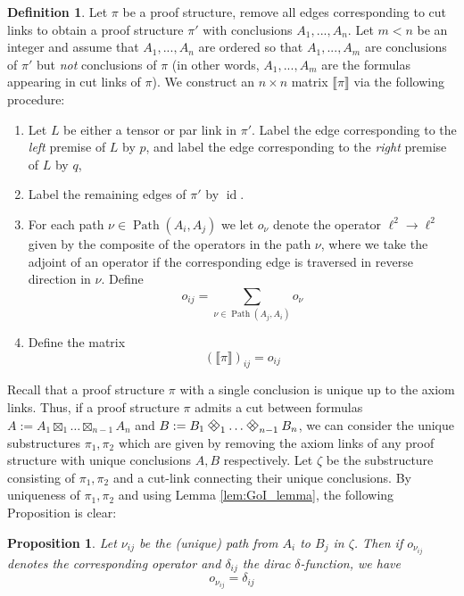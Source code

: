\documentclass[12pt]{article}
\theoremstyle{plain}
\newtheorem{proposition}[thm]{Proposition}
\theoremstyle{definition}
\newtheorem{defn}[thm]{Definition} %
\newcommand{\lto}{\longrightarrow}
\DeclareRobustCommand{\diamondtimes}{%
	\mathbin{\text{\rotatebox[origin=c]{45}{$\boxplus$}}}%
}
\begin{document}
	\begin{defn}
		Let $\pi$ be a proof structure, remove all edges corresponding to cut links to obtain a proof structure $\pi'$ with conclusions $A_1,...,A_n$.  Let $m < n$ be an integer and assume that $A_1,...,A_n$ are ordered so that $A_1,...,A_m$ are conclusions of $\pi'$ but \emph{not} conclusions of $\pi$ (in other words, $A_1,...,A_m$ are the formulas appearing in cut links of $\pi$).  We construct an $n \times n$ matrix $\llbracket \pi \rrbracket$ via the following procedure:
		\begin{enumerate}
			\item Let $L$ be either a tensor or par link in $\pi'$. Label the edge corresponding to the \emph{left} premise of $L$ by $p$, and label the edge corresponding to the \emph{right} premise of $L$ by $q$,
			\item Label the remaining edges of $\pi'$ by $\operatorname{id}$.
			\item For each path $\nu \in \operatorname{Path}(A_i,A_j)$ we let $o_\nu$ denote the operator $\ell^2 \lto \ell^2$ given by the composite of the operators in the path $\nu$, where we take the adjoint of an operator if the corresponding edge is traversed in reverse direction in $\nu$. Define 
			$$o_{ij} = \sum_{\nu \in \operatorname{Path}(A_j,A_i)}o_\nu$$
			\item Define the matrix
			\begin{equation}
				(\llbracket \pi \rrbracket)_{ij} = o_{ij}
			\end{equation}
		\end{enumerate}
	\end{defn}
	Recall that a proof structure $\pi$ with a single conclusion is unique up to the axiom links. Thus, if a proof structure $\pi$ admits a cut between formulas $A := A_1 \boxtimes_1 \hdots \boxtimes_{n-1} A_n$ and $B:=B_1 \diamondtimes_1 \hdots \diamondtimes_{n-1} B_n$, we can consider the unique substructures $\pi_1,\pi_2$ which are given by removing the axiom links of any proof structure with unique conclusions $A,B$ respectively.  Let $\zeta$ be the substructure consisting of $\pi_1,\pi_2$ and a cut-link connecting their unique conclusions. By uniqueness of $\pi_1,\pi_2$ and using Lemma \ref{lem:GoI_lemma}, the following Proposition is clear:
	\begin{proposition}\label{prop:main_GoI_prop}
		Let $\nu_{ij}$ be the (unique) path from $A_i$ to $B_j$ in $\zeta$. Then if $o_{\nu_{ij}}$ denotes the corresponding operator and $\delta_{ij}$ the dirac $\delta$-function, we have
		\begin{equation}
			o_{\nu_{ij}} = \delta_{ij}
		\end{equation}
	\end{proposition}
\end{document}
